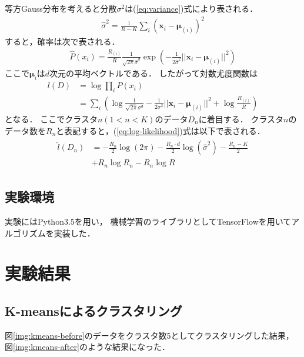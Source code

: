 \documentclass[10pt,a4j]{ltjsarticle}
\def\figref#1{図\ref{#1}}
\def\eqref#1{(\ref{#1})式}
\begin{document}
等方Gauss分布を考えると分散$\sigma^2$は\eqref{eq:variance}により表される．
\begin{align}
  \label{eq:variance}
  \hat{\sigma}^2 = \frac{1}{R-K}\sum_i\left({\bm x}_i-{\bm \mu}_{(i)}\right)^2
\end{align}
すると，確率は次で表される．
\begin{align}
  \label{eq:gaussian-distribution}
  \hat{P}(x_i) = \frac{R_{(i)}}{R}\frac{1}{\sqrt{2\pi}\hat{\sigma}^d}
    \exp\left(-\frac{1}{2\hat{\sigma}^2}||{\bm x}_i-{\bm \mu}_{(i)}||^2\right)
\end{align}
ここで${\bm \mu}_{i}$は$d$次元の平均ベクトルである．
したがって対数尤度関数は
\begin{align}
  \label{eq:log-likelihood}
  l(D) &= \log \prod_i P(x_i) \\\nonumber
  &= \sum_i \left( \log\frac{1}{\sqrt{2\pi}\sigma^d}-\frac{1}{2\sigma^2}||{\bm x}_i-{\bm \mu}_{(i)}||^2 + \log\frac{R_{(i)}}{R} \right)
\end{align}
となる．
ここでクラスタ$n (1 < n < K)$のデータ$D_n$に着目する．
クラスタ$n$のデータ数を$R_n$と表記すると，\eqref{eq:log-likelihood}は以下で表される．
\begin{align}
  \begin{split}
    \hat{l}(D_n) &= -\frac{R_n}{2}\log(2\pi) - \frac{R_n \cdot d}{2}\log(\hat{\sigma}^2) -
    \frac{R_n - K}{2}\\ &
    + R_n\log R_n - R_n \log R
  \end{split}
\end{align}

\subsection{実験環境}
実験にはPython3.5を用い，
機械学習のライブラリとしてTensorFlowを用いてアルゴリズムを実装した．

\section{実験結果}
\subsection{K-meansによるクラスタリング}
\figref{img:kmeans-before}のデータをクラスタ数5としてクラスタリングした結果，
\figref{img:kmeans-after}のような結果になった．
\end{document}
